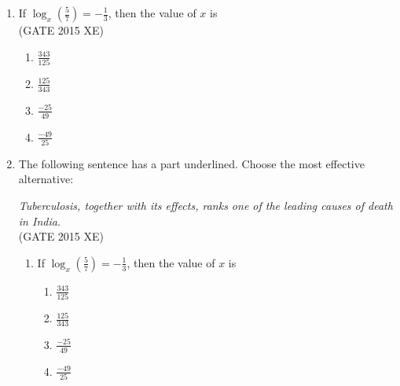 \documentclass[journal,12pt,onecolumn]{IEEEtran}
\begin{document}
\begin{enumerate}
\begin{multicols}{4}
<<<<<<< HEAD
\end{multicols}


\item If $\log_x \left(\frac{5}{7}\right) = -\frac{1}{3}$, then the value of $x$ is  \\

\hfill{(GATE 2015 XE)} 
\begin{multicols}{4}
\begin{enumerate}
\item $\frac{343}{125}$
\item $\frac{125}{343}$
\item $\frac{-25}{49}$
\item $\frac{-49}{25}$
\end{enumerate}
\end{multicols}

\item The following sentence has a part underlined. Choose the most effective alternative:  

\emph{Tuberculosis, together with its effects, ranks one of the leading causes of death in India.} \\
\hfill{(GATE 2015 XE)}

\begin{multicols}{2}
\begin{enumerate}
=======

\vspace{0.5cm}

\item If $\log_x \left(\frac{5}{7}\right) = -\frac{1}{3}$, then the value of $x$ is  

\vspace{0.2cm}
\begin{enumerate}[label=\alph*)]
\item $\frac{343}{125}$
\vspace{0.1cm}
\item $\frac{125}{343}$
\vspace{0.1cm}
\item $\frac{-25}{49}$
\vspace{0.1cm}
\item $\frac{-49}{25}$
\end{enumerate}


\end{enumerate}
\end{multicols}
\end{enumerate}
\end{document}

